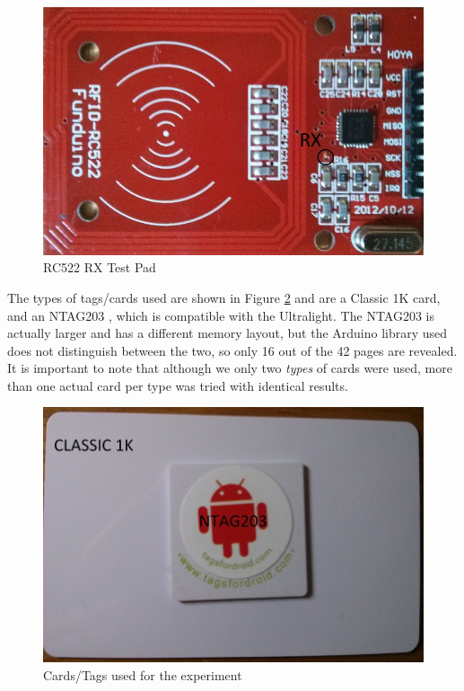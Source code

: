 \documentclass[fleqn,10pt]{SelfArx} %
\begin{document}
\begin{figure}[h]
  \includegraphics[width=\linewidth]{img/rc522pic}
  \caption{RC522 RX Test Pad}
  \label{fig:rc522pic}
\end{figure}


The types of tags/cards used are shown in Figure \ref{fig:cards} and are a Classic 1K card, and an NTAG203 \cite{ntag203}, which is compatible with the Ultralight. The NTAG203 is actually larger and has a different memory layout, but the Arduino library used does not distinguish between the two, so only 16 out of the 42 pages are revealed. It is important to note that although we only two {\em types} of cards were used, more than one actual card per type was tried with identical results.

\begin{figure}[h]
  \includegraphics[width=\linewidth]{img/cards}
  \caption{Cards/Tags used for the experiment}
  \label{fig:cards}
\end{figure}
\end{document}
